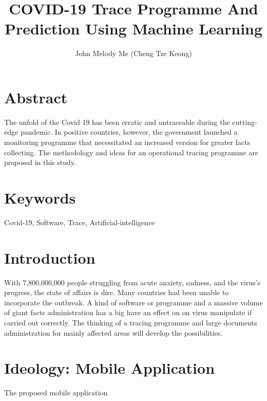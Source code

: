 \documentclass[a4paper]{article}
\title{COVID-19 Trace Programme And Prediction Using Machine Learning}
\author{John Melody Me (Cheng Tze Keong)}
\begin{document}
	\maketitle
	
	\section*{Abstract}
	The unfold of the Covid 19 has been erratic and untraceable during the cutting-edge pandemic. In positive countries, however, the government launched a monitoring programme that necessitated an increased version for greater facts collecting. The methodology and ideas for an operational tracing programme are proposed in this study. 
	
	\section*{Keywords}
	Covid-19, Software, Trace, Artificial-intelligence
	\begin{multicols*}{2}
		
		\section{Introduction}
		With 7,800,000,000 people struggling from acute anxiety, sadness, and the virus's progress, the state of affairs is dire. Many countries had been unable to incorporate the outbreak. A kind of software or programme and a massive volume of giant facts administration has a big have an effect on on virus manipulate if carried out correctly. The thinking of a tracing programme and large documents administration for mainly affected areas will develop the possibilities. 
		
		\section{Ideology: Mobile Application}
		The proposed mobile application 
		
	\end{multicols*}
	
\end{document}
